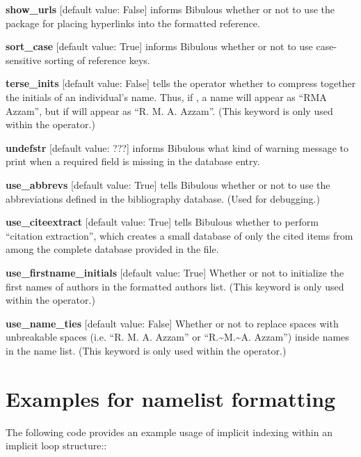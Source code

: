 \documentclass[letterpaper,10pt,english]{sphinxmanual}
\begin{document}
\textbf{show\_urls} {[}default value: False{]} informs Bibulous whether or not to use the  package for placing hyperlinks into the formatted reference.

\textbf{sort\_case} {[}default value: True{]} informs Bibulous whether or not to use case-sensitive sorting of reference keys.

\textbf{terse\_inits} {[}default value: False{]} tells the  operator whether to compress together the initials of an individual's name. Thus, if , a name will appear as ``RMA Azzam'', but if  will appear as ``R. M. A. Azzam''. (This keyword is only used within the  operator.)

\textbf{undefstr} {[}default value: ???{]} informs Bibulous what kind of warning message to print when a required field is missing in the database entry.

\textbf{use\_abbrevs} {[}default value: True{]} tells Bibulous whether or not to use the abbreviations defined in the bibliography database. (Used for debugging.)

\textbf{use\_citeextract} {[}default value: True{]} tells Bibulous whether to perform ``citation extraction'', which creates a small database of only the cited items from among the complete database provided in the  file.

\textbf{use\_firstname\_initials} {[}default value: True{]} Whether or not to initialize the first names of authors in the formatted authors list. (This keyword is only used within the  operator.)

\textbf{use\_name\_ties} {[}default value: False{]} Whether or not to replace spaces with unbreakable spaces (i.e. ``R. M. A. Azzam'' or ``R.\textasciitilde{}M.\textasciitilde{}A. Azzam'') inside names in the name list. (This keyword is only used within the  operator.)


\section{Examples for namelist formatting}
\label{guidelines_for_writing_style_templates:examples-for-namelist-formatting}
The following code provides an example usage of implicit indexing within an implicit loop structure::
\end{document}
